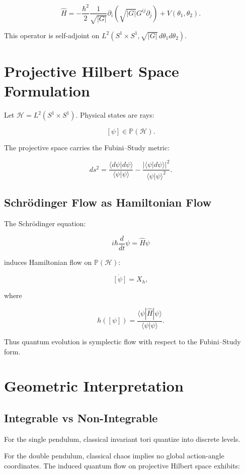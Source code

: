 \documentclass[11pt]{article}
\begin{document}
\[
\boxed{
\hat H =
-\frac{\hbar^2}{2}
\frac{1}{\sqrt{|G|}}
\partial_i
\left(
\sqrt{|G|}
G^{ij}
\partial_j
\right)
+
V(\theta_1,\theta_2)
}.
\]

This operator is self-adjoint on $L^2(S^1\times S^1, \sqrt{|G|}\, d\theta_1 d\theta_2)$.

\section{Projective Hilbert Space Formulation}

Let $\mathcal{H}=L^2(S^1\times S^1)$.
Physical states are rays:

\[
[\psi] \in \mathbb{P}(\mathcal{H}).
\]

The projective space carries the Fubini--Study metric:

\[
ds^2 =
\frac{\langle d\psi|d\psi\rangle}{\langle\psi|\psi\rangle}
-
\frac{|\langle\psi|d\psi\rangle|^2}
{\langle\psi|\psi\rangle^2}.
\]

\subsection{Schr\"odinger Flow as Hamiltonian Flow}

The Schr\"odinger equation:

\[
i\hbar \frac{d}{dt} \psi = \hat H \psi
\]

induces Hamiltonian flow on $\mathbb{P}(\mathcal{H})$:

\[
\dot{[\psi]} = X_{h},
\]

where

\[
h([\psi]) =
\frac{\langle\psi|\hat H|\psi\rangle}
{\langle\psi|\psi\rangle}.
\]

Thus quantum evolution is symplectic flow
with respect to the Fubini--Study form.

\section{Geometric Interpretation}

\subsection{Integrable vs Non-Integrable}

For the single pendulum, classical invariant tori
quantize into discrete levels.

For the double pendulum,
classical chaos implies no global action-angle coordinates.
The induced quantum flow on projective Hilbert space
exhibits:
\end{document}
